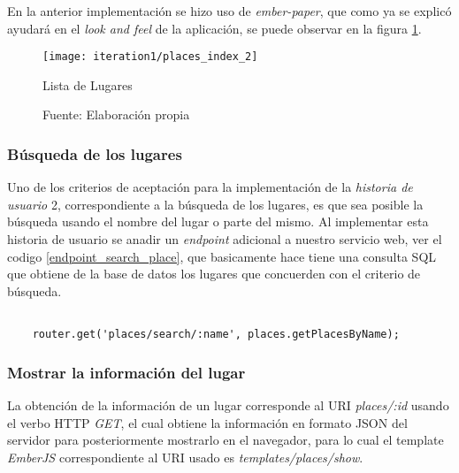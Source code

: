 En la anterior implementación se hizo uso de \emph{ember-paper}, que como ya se explicó ayudará en el \emph{look and feel} de la aplicación, se puede observar en la figura \ref{fig:places_index}. \\


\begin{figure}[H]
  \begin{center}
    \texttt{[image: iteration1/places\_index\_2]}
    \caption{Lista de Lugares}
    \label{fig:places_index}
    \caption*{Fuente: Elaboración propia}
  \end{center}
\end{figure}


\subsubsection{Búsqueda de los lugares}
\label{subs:busqueda de los lugares}

Uno de los criterios de aceptación para la implementación de la \emph{historia de usuario} 2, correspondiente a la búsqueda de los lugares, es que sea posible la búsqueda usando el nombre del lugar o parte del mismo. Al implementar esta historia de usuario se anadir un \emph{endpoint} adicional a nuestro servicio web, ver el codigo \ref{endpoint_search_place}, que basicamente hace tiene una consulta SQL que obtiene de la base de datos los lugares que concuerden con el criterio de búsqueda. \\

\begin{center}
  \begin{lstlisting}[label=endpoint_search_place,caption=Implementación de la búsqueda de lugares en el Servicio Web]

    router.get('places/search/:name', places.getPlacesByName);

  \end{lstlisting}
\end{center}


\subsubsection{Mostrar la información del lugar}
\label{subs:Mostrar información del lugar}

La obtención de la información de un lugar corresponde al URI \emph{places/:id} usando el verbo HTTP \emph{GET}, el cual obtiene la información en formato JSON del servidor para posteriormente mostrarlo en el navegador, para lo cual el template \emph{EmberJS} correspondiente al URI usado es \emph{templates/places/show}. \\

